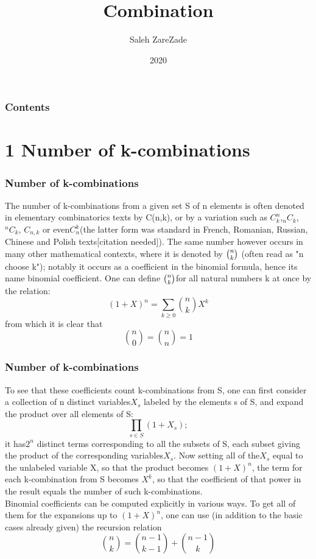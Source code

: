 \documentclass{beamer}
\title{Combination}
\author{Saleh ZareZade}
\date{2020}
\begin{document}
\frame{\titlepage}

\begin{frame} 
\frametitle{Contents} 
\tableofcontents
\end{frame} 

\section{1 Number of k-combinations}

\begin{frame}
\frametitle{Number of k-combinations}
The number of k-combinations from a given set S of n elements is often denoted in elementary combinatorics texts by C(n,k), or by a variation such as $C_{k}^{n}$,$ {}_{n}C_{k}$,${}^{n}C_{k}$, $C_{{n,k}}$ or even$ C_{n}^{k} $(the latter form was standard in French, Romanian, Russian, Chinese and Polish texts[citation needed]). The same number however occurs in many other mathematical contexts, where it is denoted by ${\tbinom {n}{k}}$ (often read as "n choose k"); notably it occurs as a coefficient in the binomial formula, hence its name binomial coefficient. One can define ${\tbinom {n}{k}} $for all natural numbers k at once by the relation:
$$(1+X)^n=\sum_{k\ge 0}{{\binom {n}{k}}X^k}$$
from which it is clear that
$${\binom {n}{0}}={\binom {n}{n}}=1$$
\end{frame}

\begin{frame}
\frametitle{Number of k-combinations}
To see that these coefficients count k-combinations from S, one can first consider a collection of n distinct variables$ X_s$ labeled by the elements s of S, and expand the product over all elements of S:
$$\prod_{s\in S}{(1+X_s);}$$
it has$ 2^n$ distinct terms corresponding to all the subsets of S, each subset giving the product of the corresponding variables$ X_s$. Now setting all of the$ X_s$ equal to the unlabeled variable X, so that the product becomes $(1 + X)^n$, the term for each k-combination from S becomes $X^k$, so that the coefficient of that power in the result equals the number of such k-combinations.\\
Binomial coefficients can be computed explicitly in various ways. To get all of them for the expansions up to $(1 + X)^n$, one can use (in addition to the basic cases already given) the recursion relation
$${\binom {n}{k}}={\binom {n-1}{k-1}}+{\binom {n-1}{k}}$$
\end{frame}
\end{document}
